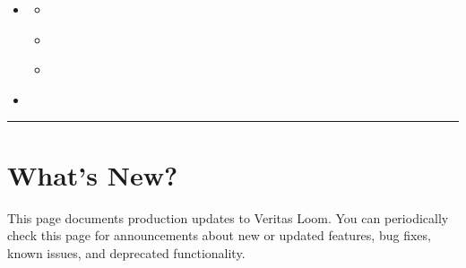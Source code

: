 \documentclass[letterpaper,10pt,english]{sphinxmanual}
\begin{document}
\begin{sphinxShadowBox}
\begin{itemize}
\item {} 
\label{\detokenize{loom_getting_started_guide:id67}}{\hyperref[\detokenize{loom_getting_started_guide:platform-technical-specifications}]{}}
\begin{itemize}
\item {} 
\label{\detokenize{loom_getting_started_guide:id68}}{\hyperref[\detokenize{loom_getting_started_guide:scalability-specifications}]{}}

\item {} 
\label{\detokenize{loom_getting_started_guide:id69}}{\hyperref[\detokenize{loom_getting_started_guide:supported-data-types-data-sources-technologies}]{}}

\item {} 
\label{\detokenize{loom_getting_started_guide:id70}}{\hyperref[\detokenize{loom_getting_started_guide:loom-platform-software-dependency-versions}]{}}

\end{itemize}

\item {} 
\label{\detokenize{loom_getting_started_guide:id71}}{\hyperref[\detokenize{loom_getting_started_guide:next-steps}]{}}

\end{itemize}
\end{sphinxShadowBox}


\bigskip\hrule\bigskip



\chapter{What’s New?}
\label{\detokenize{loom_getting_started_guide:what-s-new}}\label{\detokenize{loom_getting_started_guide:getting-started-guide}}\label{\detokenize{loom_getting_started_guide:content-getting-started-guide}}
This page documents production updates to Veritas Loom. You can periodically check this page for announcements about new or updated features, bug fixes, known issues, and deprecated functionality.
\end{document}
